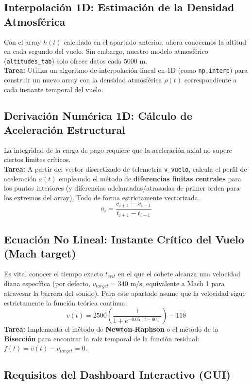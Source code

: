 	\subsection*{Interpolación 1D: Estimación de la Densidad Atmosférica}
	Con el array $h(t)$ calculado en el apartado anterior, ahora conocemos la altitud en cada segundo del vuelo. Sin embargo, nuestro modelo atmosférico (\texttt{altitudes\_tab}) solo ofrece datos cada $5000 \text{ m}$.\\
	\textbf{Tarea:} Utiliza un algoritmo de interpolación lineal en 1D (como \texttt{np.interp}) para construir un nuevo array con la densidad atmosférica $\rho(t)$ correspondiente a cada instante temporal del vuelo.
	
	\subsection*{Derivación Numérica 1D: Cálculo de Aceleración Estructural}
	La integridad de la carga de pago requiere que la aceleración axial no supere ciertos límites críticos.\\
	\textbf{Tarea:} A partir del vector discretizado de telemetría \texttt{v\_vuelo}, calcula el perfil de aceleración $a(t)$ empleando el método de \textbf{diferencias finitas centrales} para los puntos interiores (y diferencias adelantadas/atrasadas de primer orden para los extremos del array). Todo de forma estrictamente vectorizada.
	\[ a_i = \frac{v_{i+1} - v_{i-1}}{t_{i+1} - t_{i-1}} \]
	
	\subsection*{Ecuación No Lineal: Instante Crítico del Vuelo (Mach target)}
	Es vital conocer el tiempo exacto $t_{crit}$ en el que el cohete alcanza una velocidad diana específica (por defecto, $v_{target} = 340 \text{ m/s}$, equivalente a Mach 1 para atravesar la barrera del sonido). Para este apartado asume que la velocidad sigue estrictamente la función teórica continua:
	\[ v(t) = 2500 \left( \frac{1}{1 + e^{-0.05(t-60)}} \right) - 118 \]
	\textbf{Tarea:} Implementa el método de \textbf{Newton-Raphson} o el método de la \textbf{Bisección} para encontrar la raíz temporal de la función residual: $f(t) = v(t) - v_{target} = 0$.
	
	\subsection*{Requisitos del Dashboard Interactivo (GUI)}
	
